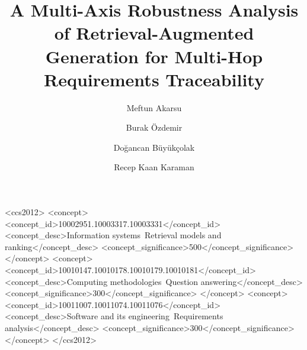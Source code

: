 \documentclass[sigconf,natbib=true,nonacm]{acmart}
\begin{document}
\title{A Multi-Axis Robustness Analysis of Retrieval-Augmented Generation
  for Multi-Hop Requirements Traceability}

\author{Meftun Akarsu}

\author{Burak \"Ozdemir}

\author{Do\u{g}ancan B\"uy\"uk\c{c}olak}

\author{Recep Kaan Karaman}



\begin{CCSXML}
<ccs2012>
  <concept>
    <concept_id>10002951.10003317.10003331</concept_id>
    <concept_desc>Information systems~Retrieval models and ranking</concept_desc>
    <concept_significance>500</concept_significance>
  </concept>
  <concept>
    <concept_id>10010147.10010178.10010179.10010181</concept_id>
    <concept_desc>Computing methodologies~Question answering</concept_desc>
    <concept_significance>300</concept_significance>
  </concept>
  <concept>
    <concept_id>10011007.10011074.10011076</concept_id>
    <concept_desc>Software and its engineering~Requirements analysis</concept_desc>
    <concept_significance>300</concept_significance>
  </concept>
</ccs2012>
\end{CCSXML}



\maketitle











\end{document}

